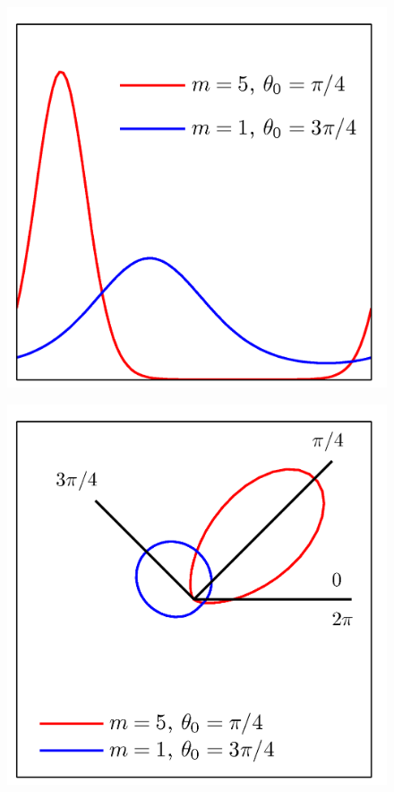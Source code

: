 \documentclass[b5paper]{book}
\numberwithin{equation}{chapter}
\begin{document}
{\begin{figure}[H]
\begin{minipage}[t]{0.5\linewidth}
		\includegraphics[scale=0.8]{Images/2-19a.png}
		\label{fig:2-19a}
		\end{minipage}
		\begin{minipage}[t]{0.5\linewidth}
		\centering
		\includegraphics[scale=0.8]{Images/2-19b.png}

\end{minipage}
\end{figure}}
\end{document}
